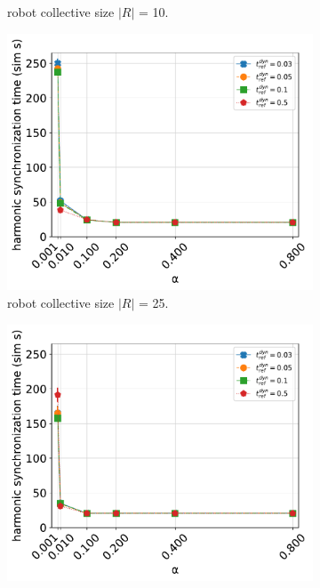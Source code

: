 \begin{figure}[ht!]
\begin{subfigure}[b]{0.5\textwidth}
		\caption{robot collective size $|R|$ = 10.}
		\label{fig:sub:t_ref_dyn_x_alpha_collsize10}
	  \end{subfigure}
	  \begin{subfigure}[b]{0.5\textwidth}
		\centering\captionsetup{width=.9\linewidth}%
		\includegraphics[width=\textwidth]{Assets/DocSegments/Chapters/ExperimentsAndResults/Figures/PerfScores/t_ref_dyn_x_alpha_hyperparamtuning_experiment_plot_collsize25.pdf}
		\caption{robot collective size $|R|$ = 25.}
		\label{fig:sub:t_ref_dyn_x_alpha_collsize25}
	  \end{subfigure}
	  \begin{subfigure}[b]{0.5\textwidth}
		\centering\captionsetup{width=.9\linewidth}%
		\includegraphics[width=\textwidth]{Assets/DocSegments/Chapters/ExperimentsAndResults/Figures/PerfScores/t_ref_dyn_x_alpha_hyperparamtuning_experiment_plot_collsize50.pdf}

\end{subfigure}
\end{figure}
